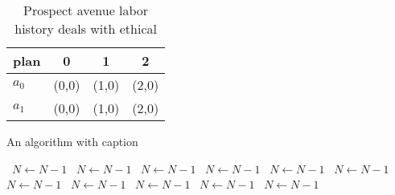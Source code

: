 \documentclass[a4paper]{article}
\begin{document}
\begin{table}
\begin{adjustbox}{width=0.6\columnwidth}
\begin{tabular}{|l|l|l|l|}
\hline
\textbf{plan} & \multicolumn{1}{c|}{\textbf{0}} & \multicolumn{1}{c|}{\textbf{1}} & \multicolumn{1}{c|}{\textbf{2}} \\ \hline
\textbf{$a_0$}  & (0,0) & (1,0) & (2,0) \\ \hline
\textbf{$a_1$}  & (0,0) & (1,0) & (2,0) \\ \hline
\end{tabular}
\end{adjustbox}
\caption{Prospect avenue labor history deals with ethical 
}
\end{table}

\begin{algorithm}
\caption{An algorithm with caption}
\begin{algorithmic}
\    \State $N \gets N - 1$
\    \State $N \gets N - 1$
\    \State $N \gets N - 1$
\    \State $N \gets N - 1$
\    \State $N \gets N - 1$
\    \State $N \gets N - 1$
\    \State $N \gets N - 1$
\    \State $N \gets N - 1$
\    \State $N \gets N - 1$
\    \State $N \gets N - 1$
\    \State $N \gets N - 1$
\EndWhile
\end{algorithmic}
\end{algorithm}
\end{document}
